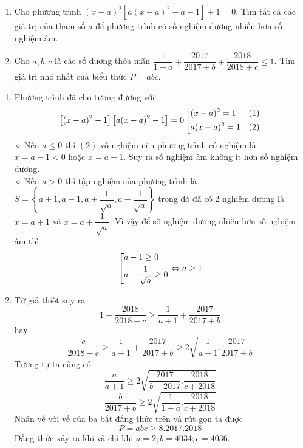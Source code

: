 \begin{ex}%
\hfill
   \begin{enumerate}
        \item Cho phương trình $(x-a)^2\left[a(x-a)^2-a-1\right]+1=0.$ Tìm tất cả các giá trị của tham số $a$ để phương trình có số nghiệm dương nhiều hơn số nghiệm âm.
        \item Cho $a,b,c$ là các số dương thỏa mãn $\dfrac{1}{1+a}+\dfrac{2017}{2017+b}+\dfrac{2018}{2018+c} \le 1$. Tìm giá trị nhỏ nhất của biểu thức $P=abc.$
    \end{enumerate}
\loigiai
    {\begin{enumerate}
    \item Phương trình đã cho tương đương với 
    $$\left[(x-a)^2-1\right]\left[a(x-a)^2-1\right]=0\left[\begin{aligned}&(x-a)^2 =1 & (1)\\&a(x-a)^2=1 & (2)\end{aligned}\right.$$
    $\diamond$ Nếu $a\le 0$ thì $(2)$ vô nghiệm nên phương trình có nghiệm là $x=a-1<0$ hoặc $x=a+1$. Suy ra số nghiệm âm không ít hơn số nghiệm dương.\\
    $\diamond$ Nếu $a> 0$ thì tập nghiệm của phương trình là $S=\left\lbrace a+1, a-1, a+\dfrac{1}{\sqrt{a}}, a-\dfrac{1}{\sqrt{a}}\right\rbrace$ trong đó đã có 2 nghiệm dương là $x=a+1$ và $x=a+\dfrac{1}{\sqrt{a}}$. Vì vậy để số nghiệm dương nhiều hơn số nghiệm âm thì
    $$\left[\begin{aligned}&a-1\geq 0\\&a-\dfrac{1}{\sqrt{a}}\ge 0\end{aligned}\right.\Leftrightarrow a\geq 1$$
    \item Từ giả thiết suy ra 
    $$1-\dfrac{2018}{2018+c}\geq \dfrac{1}{a+1}+\dfrac{2017}{2017+b}$$
    hay $$\dfrac{c}{2018+c}\geq \dfrac{1}{a+1}+\dfrac{2017}{2017+b} \geq 2\sqrt{\dfrac{1}{a+1}.\dfrac{2017}{2017+b}}$$
    Tương tự ta cũng có
    $$\dfrac{a}{a+1}\ge 2\sqrt{\dfrac{2017}{b+2017}.\dfrac{2018}{c+2018}}$$
    $$\dfrac{b}{2017+b}\ge 2\sqrt{\dfrac{1}{1+a}.\dfrac{2018}{c+2018}}$$
    Nhân vế với vế của ba bất đẳng thức trên và rút gọn ta được
    $$P=abc\ge 8.2017.2018$$
    Đẳng thức xảy ra khi và chỉ khi $a=2;b=4034;c=4036$.
    \end{enumerate}
     }
\end{ex}

